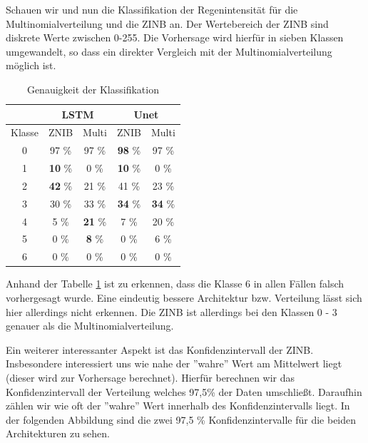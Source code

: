 \noindent Schauen wir und nun die Klassifikation der Regenintensität für die Multinomialverteilung und die ZINB an.
Der Wertebereich der ZINB sind diskrete Werte zwischen 0-255. Die Vorhersage wird hierfür in sieben Klassen umgewandelt, so dass ein direkter Vergleich mit der Multinomialverteilung möglich ist.\\


\begin{table}[h]
\centering
\begin{tabular}[h]{|c|cc|cc|}
\hline
&\multicolumn{2}{c}{LSTM} &
\multicolumn{2}{c|}{Unet} \\
\hline
Klasse & ZNIB & Multi & ZNIB & Multi \\
\hline
0 & 97 \% & 97 \% & \textbf{98} \% & 97 \% \\
\hline
1 & \textbf{10} \% & 0 \% & \textbf{10} \% & 0 \% \\
\hline
2 & \textbf{42} \% & 21 \% & 41 \% & 23 \% \\
\hline
3 & 30 \% & 33 \% & \textbf{34} \% & \textbf{34} \% \\
\hline
4 & 5 \% & \textbf{21} \% & 7 \% & 20 \% \\
\hline
5 & 0 \% & \textbf{8} \% & 0 \% & 6 \% \\
\hline
6 & 0 \% & 0 \% & 0 \% & 0 \% \\
\hline
\end{tabular}
\caption{Genauigkeit der Klassifikation\label{tab:raintable}}
\end{table}

\noindent Anhand der Tabelle \ref{tab:raintable} ist zu erkennen, dass die Klasse 6 in allen Fällen falsch vorhergesagt wurde.
Eine eindeutig bessere Architektur bzw. Verteilung lässt sich hier allerdings nicht erkennen. Die ZINB ist allerdings bei den Klassen 0 - 3 genauer als die Multinomialverteilung.


\noindent Ein weiterer interessanter Aspekt ist das Konfidenzintervall der ZINB. Insbesondere interessiert uns wie nahe der ''wahre'' Wert am Mittelwert liegt (dieser wird zur Vorhersage berechnet).
Hierfür berechnen wir das Konfidenzintervall der Verteilung welches 97,5\% der Daten umschließt. Daraufhin zählen wir wie oft der ''wahre'' Wert innerhalb des Konfidenzintervalls liegt.
In der folgenden Abbildung sind die zwei 97,5 \% Konfidenzintervalle für die beiden Architekturen zu sehen.\\


